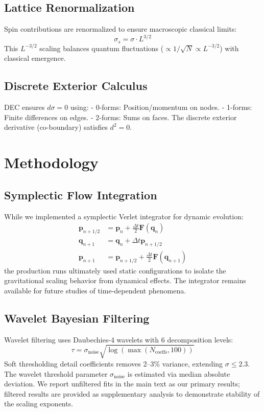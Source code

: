 \documentclass[prd,twocolumn,showpacs,superscriptaddress]{revtex4-2}
\begin{document}
	\subsection{Lattice Renormalization}
	
	Spin contributions are renormalized to ensure macroscopic classical limits:
	\begin{equation}
		\sigma_s = \sigma \cdot L^{3/2}
		\label{eq:spin_scaling}
	\end{equation}
	This \(L^{-3/2}\) scaling balances quantum fluctuations (\(\propto 1/\sqrt{N} \propto L^{-3/2}\)) with classical emergence.
	
	\subsection{Discrete Exterior Calculus}
	
	DEC ensures \(d\sigma = 0\) using:
	- 0-forms: Position/momentum on nodes.
	- 1-forms: Finite differences on edges.
	- 2-forms: Sums on faces.
	The discrete exterior derivative (co-boundary) satisfies \(d^2 = 0\).
	
	\section{Methodology}
	
	\subsection{Symplectic Flow Integration}
	
	While we implemented a symplectic Verlet integrator for dynamic evolution:
	\begin{align}
		\bm{p}_{n+1/2} &= \bm{p}_n + \frac{\Delta t}{2} \bm{F}(\bm{q}_n) \\
		\bm{q}_{n+1} &= \bm{q}_n + \Delta t \bm{p}_{n+1/2} \\
		\bm{p}_{n+1} &= \bm{p}_{n+1/2} + \frac{\Delta t}{2} \bm{F}(\bm{q}_{n+1})
	\end{align}
	the production runs ultimately used static configurations to isolate the gravitational scaling behavior from dynamical effects. The integrator remains available for future studies of time-dependent phenomena.
	
	\subsection{Wavelet Bayesian Filtering}
	
	Wavelet filtering uses Daubechies-4 wavelets with 6 decomposition levels:
	\begin{equation}
		\tau = \sigma_{\text{noise}} \sqrt{\log(\max(N_{\text{coeffs}}, 100))}
	\end{equation}
	Soft thresholding detail coefficients removes 2--3\% variance, extending \(\sigma \leq 2.3\). The wavelet threshold parameter $\sigma_{\text{noise}}$ is estimated via median absolute deviation. We report unfiltered fits in the main text as our primary results; filtered results are provided as supplementary analysis to demonstrate stability of the scaling exponents.
	
\end{document}
